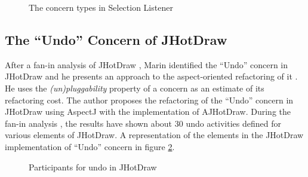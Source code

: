 \begin{figure}[H]
	\centering
  	\caption{The concern types in Selection Listener \cite{marin2005approach}}
  	\label{fig:Concerns_Selection_Listener}
\end{figure}


\subsection{The ``Undo'' Concern of JHotDraw}\label{The Undo Concern of JHotDraw}
After a fan-in analysis of JHotDraw \cite{marin2004identifying}, Marin identified the  ``Undo'' concern in JHotDraw and he presents an approach to the aspect-oriented refactoring of it \cite{marin2004refactoring}. 
He uses the \textit{(un)pluggability} property of a concern as an estimate of its refactoring cost. 
The author proposes the refactoring of the ``Undo'' concern in JHotDraw using AspectJ with the implementation of AJHotDraw. 
During the fan-in analysis \cite{marin2004identifying}, the results have shown about 30 undo activities defined for various elements of JHotDraw. 
A representation of the elements in the JHotDraw implementation of ``Undo'' concern in figure \ref{fig:Participants_for_undo_in_JHotDraw}.

\begin{figure}[H]
	\centering
  	\caption{Participants for undo in JHotDraw \cite{marin2004refactoring}}
  	\label{fig:Participants_for_undo_in_JHotDraw}
\end{figure}

